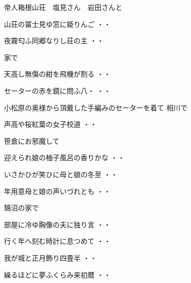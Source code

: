 \vspace{0.6cm}
帝人箱根山荘　塩見さん　岩田さんと
\begin{shiika}山荘の冨士見ゆ窓に姫りんご
\hfill{・・}\end{shiika}
\begin{shiika}夜霧匂ふ同郷なりし荘の主
\hfill{・・}\end{shiika}
\vspace{0.6cm}
家で
\begin{shiika}天高し無傷の紺を飛機が割る
\hfill{・・}\end{shiika}
\vspace{0.6cm}
\begin{shiika}セーターの赤を鏡に問ふ八・
\hfill{・・}\end{shiika}
\qquad\qquad\qquad 小松原の奥様から頂戴した手編みのセーターを着て
\vspace{0.6cm}
相川で
\begin{shiika}声高や桜紅葉の女子校道
\hfill{・・}\end{shiika}
\vspace{0.6cm}
笹倉にお邪魔して
\begin{shiika}迎えられ娘の柚子風呂の香りかな
\hfill{・・}\end{shiika}
\begin{shiika}いさかひが笑ひに母と娘の冬至
\hfill{・・}\end{shiika}
\begin{shiika}年用意母と娘の声いづれとも
\hfill{・・}\end{shiika}
\vspace{0.6cm}
鵠沼の家で
\begin{shiika}部屋に冷ゆ胸像の夫に独り言
\hfill{・・}\end{shiika}
\begin{shiika}行く年へ刻む時計に息つめて
\hfill{・・}\end{shiika}
\begin{shiika}我が城と正月飾り四畳半
\hfill{・・}\end{shiika}
\begin{shiika}繰るほどに夢ふくらみ来初暦
\hfill{・・}\end{shiika}
